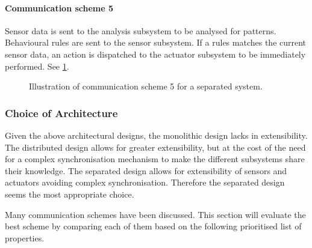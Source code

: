 \paragraph{Communication scheme 5}

Sensor data is sent to the analysis subsystem to be analysed for patterns. Behavioural rules are sent to the sensor subsystem. If a rules matches the current sensor data, an action is dispatched to the actuator subsystem to be immediately performed. See \cref{fig:separated_subsystems_scheme5}.

\begin{figure}[htbp]
\centering
{}
\caption[Communication scheme 5]{Illustration of communication scheme 5 for a separated system.}\label{fig:separated_subsystems_scheme5}
\end{figure}

\subsubsection{Choice of Architecture}

Given the above architectural designs, the monolithic design lacks in extensibility. The distributed design allows for greater extensibility, but at the cost of the need for a complex synchronisation mechanism to make the different subsystems share their knowledge. The separated design allows for extensibility of sensors and actuators avoiding complex synchronisation. Therefore the separated design seems the most appropriate choice.

Many communication schemes have been discussed. This section will evaluate the best scheme by comparing each of them based on the following prioritised list of properties.

